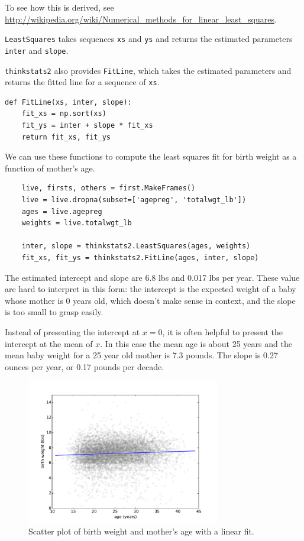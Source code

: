 \documentclass[12pt]{book}
\begin{document}
To see how this is derived, see
\url{http://wikipedia.org/wiki/Numerical_methods_for_linear_least_squares}.

{\tt LeastSquares} takes sequences
{\tt xs} and {\tt ys} and returns the estimated parameters {\tt inter}
and {\tt slope}.

{\tt thinkstats2} also provides {\tt FitLine}, which takes the
estimated parameters and returns the fitted line for a sequence
of {\tt xs}.

\begin{verbatim}
def FitLine(xs, inter, slope):
    fit_xs = np.sort(xs)
    fit_ys = inter + slope * fit_xs
    return fit_xs, fit_ys
\end{verbatim}

We can use these functions to compute the least squares fit for
birth weight as a function of mother's age.

\begin{verbatim}
    live, firsts, others = first.MakeFrames()
    live = live.dropna(subset=['agepreg', 'totalwgt_lb'])
    ages = live.agepreg
    weights = live.totalwgt_lb

    inter, slope = thinkstats2.LeastSquares(ages, weights)
    fit_xs, fit_ys = thinkstats2.FitLine(ages, inter, slope)
\end{verbatim}

The estimated intercept and slope are 6.8 lbs and 0.017 lbs per year.
These value are hard to interpret in this form: the intercept is
the expected weight of a baby whose mother is 0 years old, which
doesn't make sense in context, and the slope is too small to
grasp easily.

Instead of presenting the intercept at $x=0$, it
is often helpful to present the intercept at the mean of $x$.  In
this case the mean age is about 25 years and the mean baby weight
for a 25 year old mother is 7.3 pounds.  The slope is 0.27 ounces
per year, or 0.17 pounds per decade.

\begin{figure}
\centerline{\includegraphics[height=2.5in]{figs/linear1.pdf}}
\caption{Scatter plot of birth weight and mother's age with
a linear fit.}
\label{linear1}
\end{figure}
\end{document}
